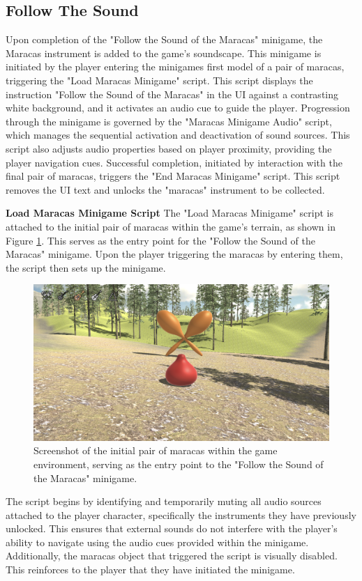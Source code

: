 \documentclass{l4proj}
\begin{document}
\subsection{Follow The Sound}
Upon completion of the "Follow the Sound of the Maracas" minigame, the Maracas instrument is added to the game's soundscape. This minigame is initiated by the player entering the minigames first model of a pair of maracas, triggering the "Load Maracas Minigame" script. This script displays the instruction "Follow the Sound of the Maracas" in the UI against a contrasting white background, and it activates an audio cue to guide the player. Progression through the minigame is governed by the "Maracas Minigame Audio" script, which manages the sequential activation and deactivation of sound sources. This script also adjusts audio properties based on player proximity, providing the player navigation cues. Successful completion, initiated by interaction with the final pair of maracas, triggers the "End Maracas Minigame" script. This script removes the UI text and unlocks the "maracas" instrument to be collected.

\textbf{Load Maracas Minigame Script} \newline
The "Load Maracas Minigame" script is attached to the initial pair of maracas within the game's terrain, as shown in Figure \ref{fig:maracas_trigger}. This serves as the entry point for the "Follow the Sound of the Maracas" minigame. Upon the player triggering the maracas by entering them, the script then sets up the minigame.

\begin{figure}[h]
 \centering
 \includegraphics[width=0.7\linewidth]{dissertation/images/Maracas_Trigger.png} 
 \caption{Screenshot of the initial pair of maracas within the game environment, serving as the entry point to the "Follow the Sound of the Maracas" minigame.} 
 \label{fig:maracas_trigger} 
\end{figure}

The script begins by identifying and temporarily muting all audio sources attached to the player character, specifically the instruments they have previously unlocked. This ensures that external sounds do not interfere with the player's ability to navigate using the audio cues provided within the minigame. Additionally, the maracas object that triggered the script is visually disabled. This  reinforces to the player that they have initiated the minigame.
\end{document}
